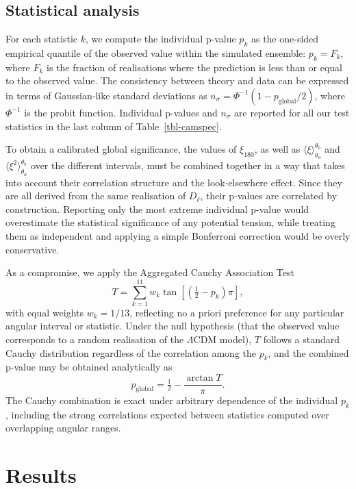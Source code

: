 \documentclass[apj,twocolumn,numberedappendix]{openjournal}
\begin{document}
\subsection{Statistical analysis}

For each statistic $k$, we compute the individual p-value $p_k$ as the one-sided empirical quantile of the observed value within the simulated ensemble: $p_k = F_k$, where $F_k$ is the
fraction of realisations where the prediction is less than or equal to the observed value.
The consistency between theory and data can be expressed in terms of Gaussian-like standard deviations as $n_\sigma = \Phi^{-1}(1 - p_\mathrm{global}/2)$, where $\Phi^{-1}$ is the probit function.
Individual p-values and $n_\sigma$ are reported for all our test statistics in the last column of Table~\ref{tbl-camspec}.

To obtain a calibrated global significance, the values of $\xi_{180}$, as well as $\langle\xi\rangle_{\theta_a}^{\theta_b}$ and $\langle\xi^2\rangle_{\theta_a}^{\theta_b}$ over the different intervals, must be combined together in a way that takes into account their correlation structure and the look-elsewhere effect.
Since they are all derived from the same realisation of $D_\ell$, their p-values are correlated by construction.
Reporting only the most extreme individual p-value would overestimate the statistical significance of any potential tension, while treating them as independent and applying a simple Bonferroni correction would be overly conservative.

As a compromise, we apply the Aggregated Cauchy Association Test \citep[ACAT;][]{Liu02012020}
\[
T = \sum_{k=1}^{11} w_k \tan\!\left[\left(\tfrac{1}{2} - p_k\right)\pi\right],
\]
with equal weights $w_k = 1/13$, reflecting no a priori preference for any particular angular interval or statistic.
Under the null hypothesis (that the observed value corresponds to a random realisation of the $\Lambda$CDM model), $T$ follows a standard Cauchy distribution regardless of the correlation among the $p_k$, and the combined p-value may be obtained analytically as
\[
p_\mathrm{global} = \tfrac{1}{2} - \frac{\arctan T}{\pi}.
\]
The Cauchy combination is exact under arbitrary dependence of the individual $p_k$, including the strong correlations expected between statistics computed over overlapping angular ranges.


\section{Results}\label{results}
\end{document}
